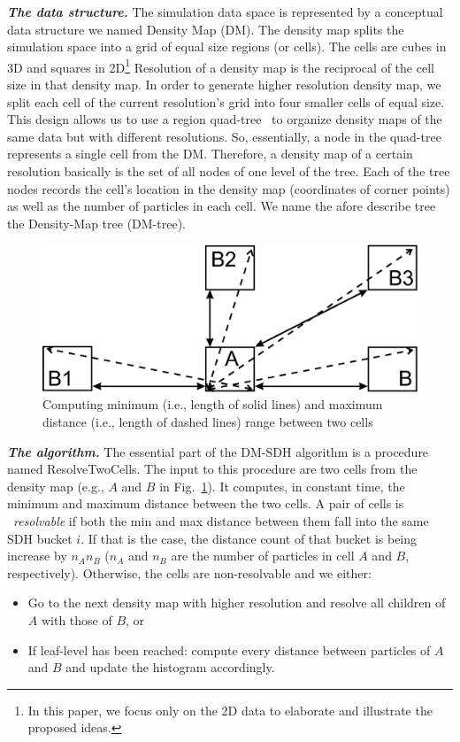 \documentclass[10pt,journal,final,letterpaper,twocolumn]{IEEEtran}
\begin{document}
\emph{\textbf{The data structure.}} The simulation data space is
represented by a conceptual data structure we named Density Map
(DM). The density map splits the simulation space into a grid of
equal size regions (or cells). The cells are cubes in 3D and squares
in 2D\footnote{In this paper, we focus only on the 2D data to
elaborate and illustrate the proposed ideas.} Resolution of a
density map is the reciprocal of the cell size in that density map.
In order to generate higher resolution density map, we split each
cell of the current resolution's grid into four smaller cells of
equal size. This design allows us to use a region
quad-tree~\cite{orenstein:ipl82} to organize density maps of the
same data but with different resolutions. So, essentially, a node in
the quad-tree represents a single cell from the DM. Therefore, a
density map of a certain resolution basically is the set of all
nodes of one level of the tree. Each of the tree nodes records the
cell's location in the density map (coordinates of corner points) as
well as the number of particles in each cell. We name the afore
describe tree the Density-Map tree (DM-tree).

\begin{figure}
 \centerline{ \includegraphics[width=0.65\columnwidth]{images/resolve.eps} }
 \caption{Computing minimum (i.e., length of solid lines) and
 maximum distance (i.e., length of dashed lines) range between two
cells}
 \label{fg:resolve}
\end{figure}

\emph{\textbf{The algorithm.}} The essential part of the DM-SDH
algorithm is a procedure named {\sc ResolveTwoCells}. The input to
this procedure are two cells from the density map (e.g., $A$ and $B$
in Fig.~\ref{fg:resolve}). It computes, in constant time, the
minimum and maximum distance between the two cells. A pair of cells
is ~\emph{resolvable} if both the min and max distance between them
fall into the same SDH bucket $i$. If that is the case, the distance
count of that bucket is being increase by $n_{A}n_{B}$ ($n_{A}$ and
$n_{B}$ are the number of particles in cell $A$ and $B$,
respectively). Otherwise, the cells are non-resolvable and we
either:
\begin{itemize}
\item[(1)] Go to the next density map with higher resolution and resolve all children of $A$
with those of $B$, or
\item[(2)] If leaf-level has been reached: compute every distance between particles of $A$ and $B$ and update the
histogram accordingly.
\end{itemize}
\end{document}
